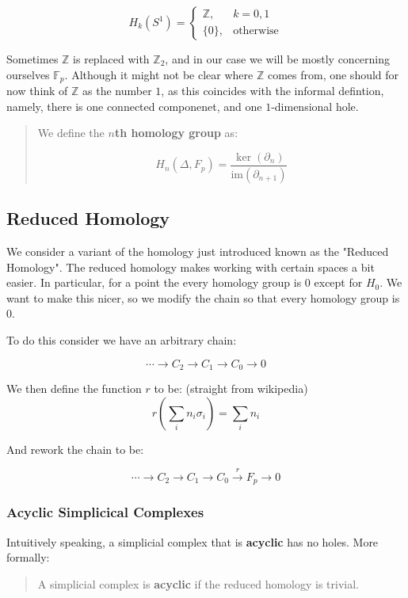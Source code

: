 \documentclass[letterpaper,12pt]{article}
\newcommand{\lra}{\longrightarrow}
\begin{document}
$$H_k(S^1) =
\begin{cases}
    \mathbb{Z}, & k = 0, 1 \\
    \{ 0 \}, & \text{otherwise}
\end{cases}
$$

Sometimes $\mathbb{Z}$ is replaced with $\mathbb{Z}_2$, and in our case we will be mostly concerning ourselves $\mathbb{F}_p$. Although it might not be clear where $\mathbb{Z}$ comes from, one should for now think of $\mathbb{Z}$ as the number $1$, as this coincides with the informal defintion, namely, there is one connected componenet, and one $1$-dimensional hole.

\begin{quote}
    We define the $n$\textbf{th homology group} as:

    $$H_n(\Delta, F_p) = \frac{\ker(\partial_n)}{\text{im}(\partial_{n+1})}$$
\end{quote}

\subsection{Reduced Homology}

We consider a variant of the homology just introduced known as the "Reduced Homology". The reduced homology makes working with certain spaces a bit easier. In particular, for a point the every homology group is $0$ except for $H_0$. We want to make this nicer, so we modify the chain so that every homology group is $0$.

To do this consider we have an arbitrary chain:

$$\cdots \lra C_2 \lra C_1 \lra C_0 \lra 0$$

We then define the function $r$ to be: (straight from wikipedia)
$$r\left(\sum_i n_i \sigma_i\right) = \sum_i n_i$$

And rework the chain to be:

$$\cdots \rightarrow C_2 \rightarrow C_1 \rightarrow C_0 \xrightarrow{r} F_p \rightarrow 0$$

\subsubsection{Acyclic Simplicical Complexes}

Intuitively speaking, a simplicial complex that is \textbf{acyclic} has no holes. More formally:

\begin{quote}
    A simplicial complex is \textbf{acyclic} if the reduced homology is trivial.
\end{quote}
\end{document}
